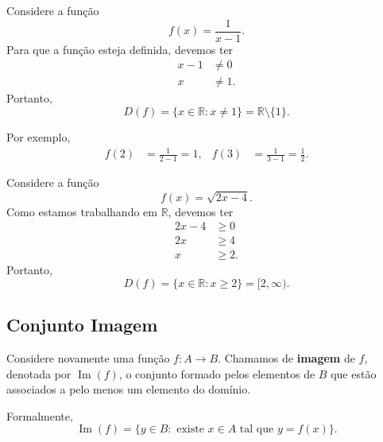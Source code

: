 \begin{example}
    Considere a função
    \begin{equation}
        f(x)=\frac{1}{x-1}.
    \end{equation}
    Para que a função esteja definida, devemos ter
    \begin{align*}
        x-1 &\neq 0 \\
        x &\neq 1.
    \end{align*}
    Portanto,
    \begin{equation}
        D(f)=\{x\in\mathbb{R}:x\neq1\}
        =\mathbb{R}\setminus\{1\}.
    \end{equation}

    Por exemplo,
    \begin{align*}
        f(2)&=\frac{1}{2-1}=1,
        &
        f(3)&=\frac{1}{3-1}=\frac{1}{2}.
    \end{align*}
\end{example}

\begin{example}
    Considere a função
    \begin{equation}
        f(x)=\sqrt{2x-4}.
    \end{equation}
    Como estamos trabalhando em $\mathbb{R}$, devemos ter
    \begin{align*}
        2x-4 &\geq 0 \\
        2x &\geq 4 \\
        x &\geq 2.
    \end{align*}
    Portanto,
    \begin{equation*}
        D(f)=\{x\in\mathbb{R}:x\geq2\}=[2,\infty).
    \end{equation*}
\end{example}

\subsection{Conjunto Imagem}

Considere novamente uma função $f:A\to B$. Chamamos de \textbf{imagem} de $f$, denotada por $\operatorname{Im}(f)$, o conjunto formado pelos elementos de $B$ que estão associados a pelo menos um elemento do domínio.

Formalmente,
\begin{equation}
    \operatorname{Im}(f)
    =\{y\in B:\text{ existe }x\in A\text{ tal que }y=f(x)\}.
\end{equation}

